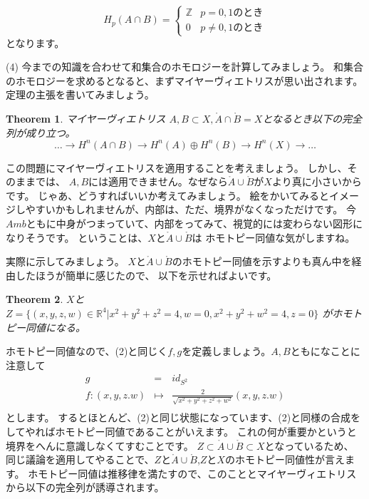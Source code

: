 \documentclass{ujarticle}
\newtheorem{thm}{Theorem}[section]
\begin{document}
\begin{equation*}
  H_p(A \cap B ) =
  \begin{cases}
    \mathbb{Z} & \text{$p =0,1$のとき}　\\
    0  & \text{$p  \neq 0,1$のとき}
  \end{cases}
\end{equation*}
となります。

(4)
今までの知識を合わせて和集合のホモロジーを計算してみましょう。
和集合のホモロジーを求めるとなると、まずマイヤーヴィエトリスが思い出されます。
定理の主張を書いてみましょう。

\begin{thm}{マイヤーヴィエトリス}
  $A,B \subset X,\mathring{A}　\cap \mathring{B} =X $となるとき以下の完全列が成り立つ。
  \begin{equation*}
  \dots \to  H^n(A \cap B) \to H^n(A) \oplus H^n(B) \to H^n(X) \to \dots
  \end{equation*}
\end{thm}
この問題にマイヤーヴィエトリスを適用することを考えましょう。
しかし、そのままでは、
$A,B$には適用できません。なぜなら$\mathring{A} \cup \mathring{B}$が$X$より真に小さいからです。
じゃあ、どうすればいいか考えてみましょう。
絵をかいてみるとイメージしやすいかもしれませんが、内部は、ただ、境界がなくなっただけです。
今$Amb$ともに中身がつまっていて、内部をってみて、視覚的には変わらない図形になりそうです。
ということは、$X$と$\mathring{A} \cup \mathring{B}$は
ホモトピー同値な気がしますね。

実際に示してみましょう。
$X$と$\mathring{A} \cup \mathring{B}$のホモトピー同値を示すよりも真ん中を経由したほうが簡単に感じたので、
以下を示せればよいです。
\begin{thm}
$X$と$Z=\{ (x,y,z,w) \in \mathbb{R}^4 |  x^2 + y^2 + z^2 = 4 ,w =0 , x^2 +y^2 + w^2 =4,z=0   \}$
がホモトピー同値になる。
\end{thm}

ホモトピー同値なので、(2)と同じく$f,g$を定義しましょう。$A,B$ともになことに注意して
\begin{eqnarray*}
  g &=& id_{S^2}　 \\
  f :(x,y,z.w) &\mapsto& \frac{2}{\sqrt{x^2 + y^2 + z^2 +w^2}}(x,y,z.w)  \\
\end{eqnarray*}
とします。
するとほとんど、(2)と同じ状態になっています、(2)と同様の合成をしてやればホモトピー同値であることがいえます。
これの何が重要かというと境界をへんに意識しなくてすむことです。
$Z \subset \mathring{A} \cup \mathring{B} \subset X$となっているため、
同じ議論を適用してやることで、$Z$と$\mathring{A} \cup \mathring{B} $,$Z$と$X$のホモトピー同値性が言えます。
ホモトピー同値は推移律を満たすので、このこととマイヤーヴィエトリスから以下の完全列が誘導されます。
\end{document}
